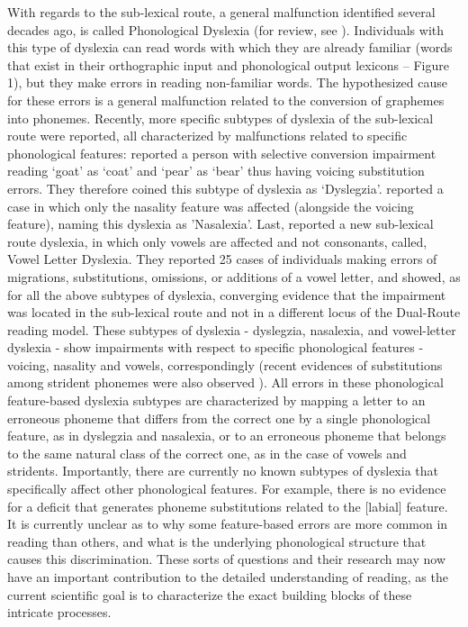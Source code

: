 With regards to the sub-lexical route, a general malfunction identified several decades ago, is called Phonological Dyslexia (for review, see \citealp{c96}). Individuals with this type of dyslexia can read words with which they are already familiar (words that exist in their orthographic input and phonological output lexicons – Figure 1), but they make errors in reading non-familiar words. The hypothesized cause for these errors is a general malfunction related to the conversion of graphemes into phonemes. Recently, more specific subtypes of dyslexia of the sub-lexical route were reported, all characterized by malfunctions related to specific phonological features: \citet{Gvion2010} reported a person with selective conversion impairment reading ‘goat’ as ‘coat’ and ‘pear’ as ‘bear’ thus having voicing substitution errors. They therefore coined this subtype of dyslexia as ‘Dyslegzia’. \citet{Gvion2012} reported  a case in which only the nasality feature was affected (alongside the voicing feature), naming this dyslexia as 'Nasalexia'. Last, \citet{kf11} reported a new sub-lexical route dyslexia, in which only vowels are affected and not consonants, called, Vowel Letter Dyslexia. They reported 25 cases of individuals making errors of migrations, substitutions, omissions, or additions of a vowel letter, and showed, as for all the above subtypes of dyslexia, converging evidence that the impairment was located in the sub-lexical route and not in a different locus of the Dual-Route reading model. These subtypes of dyslexia - dyslegzia, nasalexia, and vowel-letter dyslexia - show impairments with respect to specific phonological features - voicing, nasality and vowels, correspondingly (recent evidences of substitutions among strident phonemes were also observed \citealp{Gvion2010}). All errors in these phonological feature-based dyslexia subtypes are characterized by mapping a letter to an erroneous phoneme that differs from the correct one by a single phonological feature, as in dyslegzia and nasalexia, or to an erroneous phoneme that belongs to the same natural class of the correct one, as in the case of vowels and stridents. Importantly, there are currently no known subtypes of dyslexia that specifically affect other phonological features. For example, there is no evidence for a deficit that generates phoneme substitutions related to the [labial] feature. It is currently unclear as to why some feature-based errors are more common in reading than others, and what is the underlying phonological structure that causes this discrimination. These sorts of questions and their research may now have an important contribution to the detailed understanding of reading, as the current scientific goal is to characterize the exact building blocks of these intricate processes.

